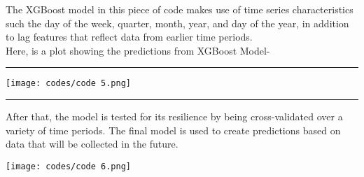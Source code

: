 \documentclass[12pt]{article}
\begin{document}
\noindent The XGBoost model in this piece of code makes use of time series characteristics such the day of the week, quarter, month, year, and day of the year, in addition to lag features that reflect data from earlier time periods.
\pagebreak
\\ Here, is a plot showing the predictions from XGBoost Model-
\vspace{0.1in}
\hrule
\begin{center}
    \texttt{[image: codes/code 5.png]}
\end{center}
\hrule
\vspace{0.1in}





After that, the model is tested for its resilience by being cross-validated over a variety of time periods. The final model is used to create predictions based on data that will be collected in the future.
\begin{center}
    \texttt{[image: codes/code 6.png]}
\end{center}
\end{document}
